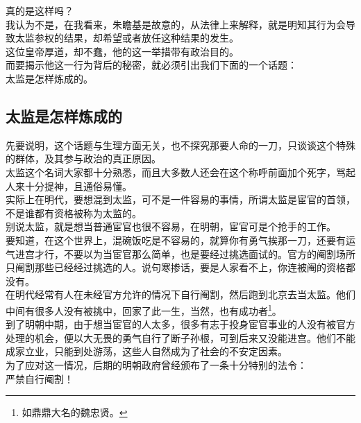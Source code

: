 \begin{multicols}{\theparacolNo}
真的是这样吗？\\

我认为不是，在我看来，朱瞻基是故意的，从法律上来解释，就是明知其行为会导致太监参权的结果，却希望或者放任这种结果的发生。\\

这位皇帝厚道，却不蠢，他的这一举措带有政治目的。\\

而要揭示他这一行为背后的秘密，就必须引出我们下面的一个话题：\\

太监是怎样炼成的。\\

\subsection{太监是怎样炼成的}
先要说明，这个话题与生理方面无关，也不探究那要人命的一刀，只谈谈这个特殊的群体，及其参与政治的真正原因。\\

太监这个名词大家都十分熟悉，而且大多数人还会在这个称呼前面加个死字，骂起人来十分提神，且通俗易懂。\\

实际上在明代，要想混到太监，可不是一件容易的事情，所谓太监是宦官的首领，不是谁都有资格被称为太监的。\\

别说太监，就是想当普通宦官也很不容易，在明朝，宦官可是个抢手的工作。\\

要知道，在这个世界上，混碗饭吃是不容易的，就算你有勇气挨那一刀，还要有运气进宫才行，不要以为当宦官那么简单，也是要经过挑选面试的。官方的阉割场所只阉割那些已经经过挑选的人。说句寒掺话，要是人家看不上，你连被阉的资格都没有。\\

在明代经常有人在未经官方允许的情况下自行阉割，然后跑到北京去当太监。他们中间有很多人没有被挑中，回家了此一生，当然，也有成功者\footnote{如鼎鼎大名的魏忠贤。}。\\

到了明朝中期，由于想当宦官的人太多，很多有志于投身宦官事业的人没有被官方处理的机会，便以大无畏的勇气自行了断子孙根，可到后来又没能进宫。他们不能成家立业，只能到处游荡，这些人自然成为了社会的不安定因素。\\

为了应对这一情况，后期的明朝政府曾经颁布了一条十分特别的法令：\\

严禁自行阉割！\\


\end{multicols}
